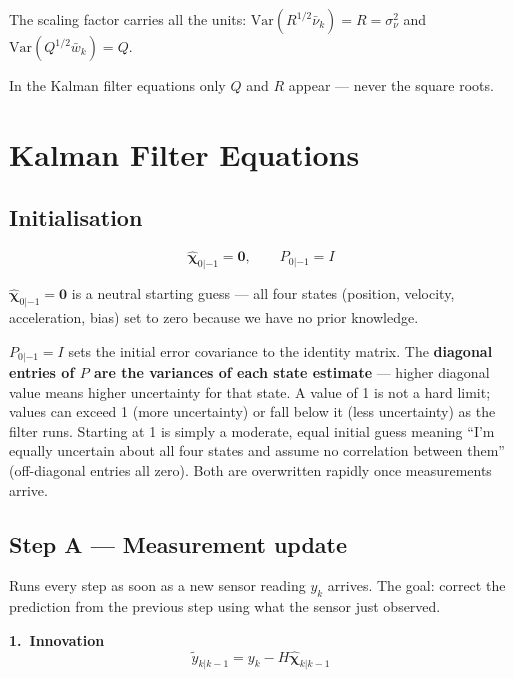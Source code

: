 \documentclass[12pt, a4paper]{article}
\begin{document}
The scaling factor carries all the units:
$\mathrm{Var}(R^{1/2}\bar{\nu}_k) = R = \sigma_\nu^2$ and
$\mathrm{Var}(Q^{1/2}\bar{w}_k) = Q$.

In the Kalman filter equations only $Q$ and $R$ appear --- never the square roots.



\section*{Kalman Filter Equations}
\vspace{-0.5cm}
\subsection*{Initialisation}
\vspace{-0.3cm}
\[
  \hat{\boldsymbol{\chi}}_{0|-1} = \mathbf{0}, \qquad P_{0|-1} = I
\]

$\hat{\boldsymbol{\chi}}_{0|-1} = \mathbf{0}$ is a neutral starting guess ---
all four states (position, velocity, acceleration, bias) set to zero
because we have no prior knowledge.

$P_{0|-1} = I$ sets the initial error covariance to the identity matrix.
The \textbf{diagonal entries of $P$ are the variances of each state estimate}
--- higher diagonal value means higher uncertainty for that state.
A value of 1 is not a hard limit; values can exceed 1 (more uncertainty)
or fall below it (less uncertainty) as the filter runs.
Starting at 1 is simply a moderate, equal initial guess meaning
``I'm equally uncertain about all four states and assume no correlation
between them'' (off-diagonal entries all zero).
Both are overwritten rapidly once measurements arrive.

\vspace{-0.2cm}
\subsection*{Step A --- Measurement update}
\vspace{-0.2cm}
Runs every step as soon as a new sensor reading $y_k$ arrives.
The goal: correct the prediction from the previous step using
what the sensor just observed.


\medskip
\textbf{1.\ Innovation}
\[
  \tilde{y}_{k|k-1} = y_k - H\hat{\boldsymbol{\chi}}_{k|k-1}
\]
\end{document}
